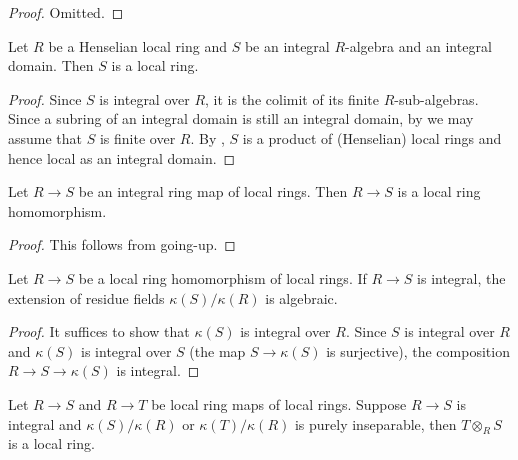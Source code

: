 \begin{proof}
    Omitted.
\end{proof}

\begin{lemma}
    Let $R$ be a Henselian local ring and $S$ be an integral $R$-algebra and an integral domain.
    Then $S$ is a local ring.
    \label{lemma:henselian-local-integral-local}
    \leanok
\end{lemma}

\begin{proof}
    Since $S$ is integral over $R$, it is the colimit of its finite $R$-sub-algebras. Since
    a subring of an integral domain is still an integral domain, by  we
    may assume that $S$ is finite over $R$.
    By , $S$ is a product of (Henselian) local rings and hence
    local as an integral domain.
\end{proof}

\begin{lemma}
    Let $R \to S$ be an integral ring map of local rings. Then $R \to S$ is a local ring homomorphism.
    \label{lemma:integral-local-hom}
    \leanok
\end{lemma}

\begin{proof}
    \leanok
    This follows from going-up.
\end{proof}

\begin{lemma}
    Let $R \to S$ be a local ring homomorphism of local rings. If $R \to S$ is integral,
    the extension of residue fields $\kappa(S) / \kappa(R)$ is algebraic.
    \label{lemma:integral-local-algebraic-residue-field}
    \leanok
\end{lemma}

\begin{proof}
    \leanok
    It suffices to show that $\kappa(S)$ is integral over $R$. Since $S$ is integral over $R$
    and $\kappa(S)$ is integral over $S$ (the map $S \to \kappa(S)$ is surjective),
    the composition $R \to S \to \kappa(S)$ is integral.
\end{proof}

\begin{lemma}
    Let $R \to S$ and $R \to T$ be local ring maps of local rings. Suppose
    $R \to S$ is integral and $\kappa(S) / \kappa(R)$ or $\kappa(T) / \kappa(R)$
    is purely inseparable, then $T \otimes_{R} S$ is a local ring.
    \label{lemma:tensorprod-local-purely-inseparable}
    \leanok
\end{lemma}

